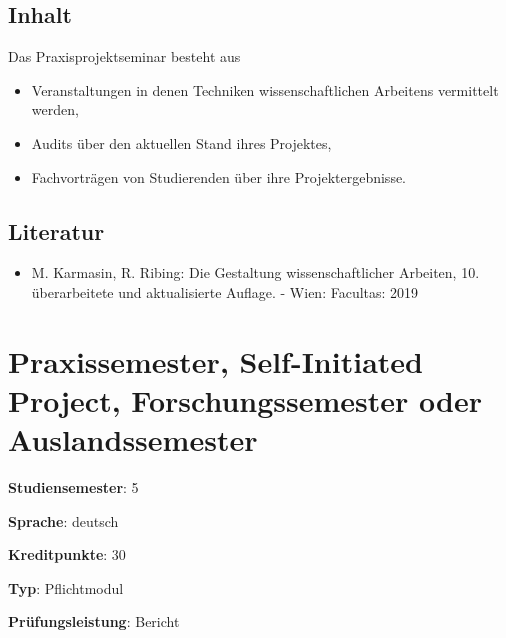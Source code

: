 \hypertarget{inhaltpathlabel....srcmodulbeschreibungen-bachelor-bpo5ba_praxisprojektseminar}{%
\section*{Inhalt\label{../../src/modulbeschreibungen-bachelor-bpo5/BA_Praxisprojektseminar}}\label{inhaltpathlabel....srcmodulbeschreibungen-bachelor-bpo5ba_praxisprojektseminar}}

Das Praxisprojektseminar besteht aus

\begin{itemize}
\tightlist
\item
  Veranstaltungen in denen Techniken wissenschaftlichen Arbeitens
  vermittelt werden,
\item
  Audits über den aktuellen Stand ihres Projektes,
\item
  Fachvorträgen von Studierenden über ihre Projektergebnisse.
\end{itemize}

\hypertarget{literaturpathlabel....srcmodulbeschreibungen-bachelor-bpo5ba_praxisprojektseminar}{%
\section*{Literatur\label{../../src/modulbeschreibungen-bachelor-bpo5/BA_Praxisprojektseminar}}\label{literaturpathlabel....srcmodulbeschreibungen-bachelor-bpo5ba_praxisprojektseminar}}

\begin{itemize}
\tightlist
\item
  M. Karmasin, R. Ribing: Die Gestaltung wissenschaftlicher Arbeiten,
  10. überarbeitete und aktualisierte Auflage. - Wien: Facultas: 2019
\end{itemize}

\hypertarget{praxissemester-self-initiated-project-forschungssemester-oder-auslandssemesterpathlabel....srcmodulbeschreibungen-bachelor-bpo5ba_praxissemester}{%
\chapter{Praxissemester, Self-Initiated Project, Forschungssemester oder
Auslandssemester\label{../../src/modulbeschreibungen-bachelor-bpo5/BA_Praxissemester}}\label{praxissemester-self-initiated-project-forschungssemester-oder-auslandssemesterpathlabel....srcmodulbeschreibungen-bachelor-bpo5ba_praxissemester}}

\begin{modulHead}
\textbf{Studiensemester}:
5
\end{modulHead}
\begin{modulHead}
\textbf{Sprache}:
deutsch
\end{modulHead}
\begin{modulHead}
\textbf{Kreditpunkte}:
30
\end{modulHead}
\begin{modulHead}
\textbf{Typ}:
Pflichtmodul
\end{modulHead}
\begin{modulHead}
\textbf{Prüfungsleistung}:
Bericht
\end{modulHead}


